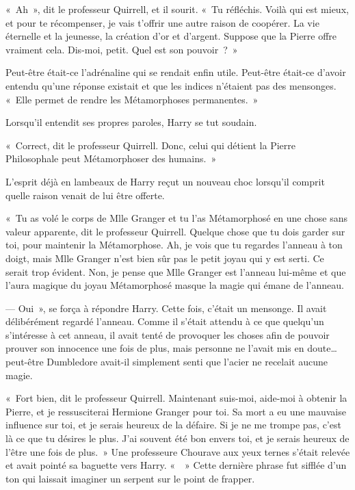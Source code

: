 «~Ah~», dit le professeur Quirrell, et il sourit. «~Tu réfléchis. Voilà qui est mieux, et pour te récompenser, je vais t'offrir une autre raison de coopérer. La vie éternelle et la jeunesse, la création d'or et d'argent. Suppose que la Pierre offre vraiment cela. Dis-moi, petit. Quel est son pouvoir~?~»

Peut-être était-ce l'adrénaline qui se rendait enfin utile. Peut-être était-ce d'avoir entendu qu'une réponse existait et que les indices n'étaient pas des mensonges. «~Elle permet de rendre les Métamorphoses permanentes.~»

Lorsqu'il entendit ses propres paroles, Harry se tut soudain.

«~Correct, dit le professeur Quirrell. Donc, celui qui détient la Pierre Philosophale peut Métamorphoser des humains.~»

L'esprit déjà en lambeaux de Harry reçut un nouveau choc lorsqu'il comprit quelle raison venait de lui être offerte.

«~Tu as volé le corps de Mlle Granger et tu l'as Métamorphosé en une chose sans valeur apparente, dit le professeur Quirrell. Quelque chose que tu dois garder sur toi, pour maintenir la Métamorphose. Ah, je vois que tu regardes l'anneau à ton doigt, mais Mlle Granger n'est bien sûr pas le petit joyau qui y est serti. Ce serait trop évident. Non, je pense que Mlle Granger est l'anneau lui-même et que l'aura magique du joyau Métamorphosé masque la magie qui émane de l'anneau.

--- Oui~», se força à répondre Harry. Cette fois, c'était un mensonge. Il avait délibérément regardé l'anneau. Comme il s'était attendu à ce que quelqu'un s'intéresse à cet anneau, il avait tenté de provoquer les choses afin de pouvoir prouver son innocence une fois de plus, mais personne ne l'avait mis en doute… peut-être Dumbledore avait-il simplement senti que l'acier ne recelait aucune magie.

«~Fort bien, dit le professeur Quirrell. Maintenant suis-moi, aide-moi à obtenir la Pierre, et je ressusciterai Hermione Granger pour toi. Sa mort a eu une mauvaise influence sur toi, et je serais heureux de la défaire. Si je ne me trompe pas, c'est là ce que tu désires le plus. J'ai souvent été bon envers toi, et je serais heureux de l'être une fois de plus.~» Une professeure Chourave aux yeux ternes s'était relevée et avait pointé sa baguette vers Harry. «~~» Cette dernière phrase fut sifflée d'un ton qui laissait imaginer un serpent sur le point de frapper.


